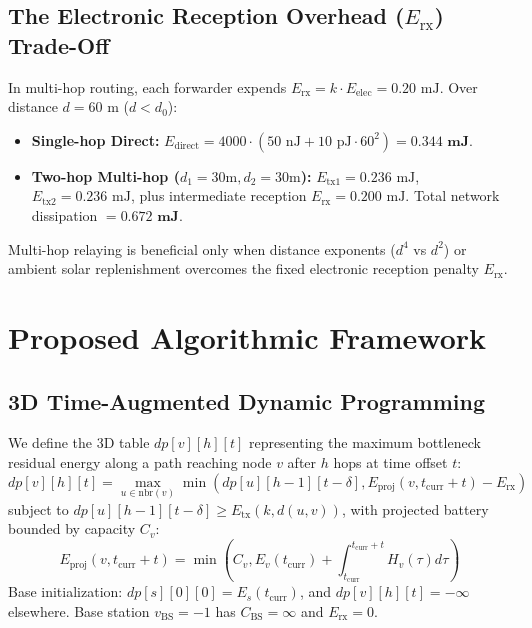 \documentclass[conference]{IEEEtran}
\begin{document}
\subsection{The Electronic Reception Overhead ($E_{\text{rx}}$) Trade-Off}
In multi-hop routing, each forwarder expends $E_{\text{rx}} = k \cdot E_{\text{elec}} = 0.20\text{ mJ}$. Over distance $d = 60\text{ m}$ ($d < d_0$):
\begin{itemize}
    \item \textbf{Single-hop Direct:} $E_{\text{direct}} = 4000 \cdot (50\text{ nJ} + 10\text{ pJ} \cdot 60^2) = \mathbf{0.344\text{ mJ}}$.
    \item \textbf{Two-hop Multi-hop ($d_1 = 30\text{m}, d_2 = 30\text{m}$):} $E_{\text{tx1}} = 0.236\text{ mJ}$, $E_{\text{tx2}} = 0.236\text{ mJ}$, plus intermediate reception $E_{\text{rx}} = 0.200\text{ mJ}$. Total network dissipation $= \mathbf{0.672\text{ mJ}}$.
\end{itemize}
Multi-hop relaying is beneficial only when distance exponents ($d^4$ vs $d^2$) or ambient solar replenishment overcomes the fixed electronic reception penalty $E_{\text{rx}}$.

\section{Proposed Algorithmic Framework}

\subsection{3D Time-Augmented Dynamic Programming}
We define the 3D table $dp[v][h][t]$ representing the maximum bottleneck residual energy along a path reaching node $v$ after $h$ hops at time offset $t$:
\begin{equation}
dp[v][h][t] = \max_{u \in \text{nbr}(v)} \min\left( dp[u][h-1][t-\delta], E_{\text{proj}}(v, t_{\text{curr}} + t) - E_{\text{rx}} \right)
\end{equation}
subject to $dp[u][h-1][t-\delta] \ge E_{\text{tx}}(k, d(u, v))$, with projected battery bounded by capacity $C_v$:
\begin{equation}
E_{\text{proj}}(v, t_{\text{curr}} + t) = \min\left( C_v, E_v(t_{\text{curr}}) + \int_{t_{\text{curr}}}^{t_{\text{curr}}+t} H_v(\tau) d\tau \right)
\end{equation}
Base initialization: $dp[s][0][0] = E_s(t_{\text{curr}})$, and $dp[v][h][t] = -\infty$ elsewhere. Base station $v_{\text{BS}} = -1$ has $C_{\text{BS}} = \infty$ and $E_{\text{rx}} = 0$.
\end{document}
